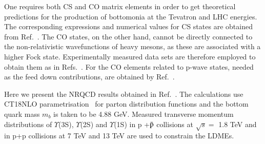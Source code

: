 One requires both CS and CO matrix elements in order to get theoretical
predictions for the production of bottomonia at the Tevatron and LHC energies.
The corresponding expressions and
numerical values for CS states are obtained from Ref.~\cite{Braaten:2000cm}.
The CO states, on the other hand, cannot be directly connected to the non-relativistic
wavefunctions of heavy mesons,
as these are associated with a higher Fock state. Experimentally measured data sets are 
therefore employed to obtain them as in Refs.~\cite{Braaten:2000cm,Cho:1995vh,Cho:1995ce}. 
For the CO elements related to p-wave states, needed as the 
feed down contributions, are obtained by Ref.~\cite{Sharma:2012dy,Feng:2015wka}.

Here we present the NRQCD results obtained in Ref.~\cite{Kumar:2021sek}.
The calculations use CT18NLO parametrisation~\cite{Hou:2019efy} for parton distribution
functions and the bottom quark mass $m_b$ is taken to be 4.88 GeV.
Measured transverse momentum distributions of $\Upsilon$(3S), 
$\Upsilon$(2S) and $\Upsilon$(1S) in p +{$\bar {\rm p}$} collisions at
$\sqrt{s}=$ 1.8 TeV and in p+p collisions at 7 TeV and 13 TeV are used to constrain
the LDMEs.

